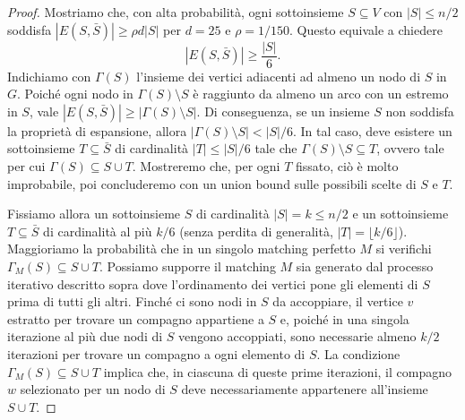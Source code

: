 \begin{proof}
	Mostriamo che, con alta probabilità, ogni sottoinsieme $S \subseteq V$ con
	$|S| \le n / 2$ soddisfa $|E(S, \bar S)| \ge \rho d |S|$ per $d = 25$ e
	$\rho = 1 / 150$. Questo equivale a chiedere
	\[
		|E(S, \bar S)| \ge \frac{|S|}{6}.
	\]
	Indichiamo con $\Gamma(S)$ l'insieme dei vertici adiacenti ad almeno un
	nodo di $S$ in $G$. Poiché ogni nodo in $\Gamma(S) \setminus S$ è
	raggiunto da almeno un arco con un estremo in $S$, vale
	$|E(S, \bar S)| \ge |\Gamma(S) \setminus S|$.
	Di conseguenza, se un insieme $S$ non soddisfa la proprietà di espansione,
	allora $|\Gamma(S) \setminus S| < |S| / 6$.
	In tal caso, deve esistere un sottoinsieme $T \subseteq \bar S$ di cardinalità
	$|T| \le |S|/6$ tale che $\Gamma(S) \setminus S \subseteq T$, ovvero tale per cui
	$\Gamma(S) \subseteq S \cup T$.
	Mostreremo che, per ogni $T$ fissato, ciò è molto improbabile, poi
	concluderemo con un union bound sulle possibili scelte di $S$ e $T$.
	
	Fissiamo allora un sottoinsieme $S$ di cardinalità $|S| = k \le n/2$ e un
	sottoinsieme $T \subseteq \bar S$ di cardinalità al più $k/6$ (senza perdita
	di generalità, $|T| = \lfloor k/6 \rfloor$).
	Maggioriamo la probabilità che in un singolo matching perfetto $M$ si verifichi
	$\Gamma_M(S) \subseteq S \cup T$.
	Possiamo supporre il matching $M$ sia generato dal processo iterativo
	descritto sopra dove l'ordinamento dei vertici pone gli elementi di $S$
	prima di tutti gli altri.
	Finché ci sono nodi in $S$ da accoppiare, il vertice $v$ estratto
	per trovare un compagno appartiene a $S$ e, poiché in una singola iterazione
	al più due nodi di $S$ vengono accoppiati, sono necessarie almeno $k/2$
	iterazioni per trovare un compagno a ogni elemento di $S$.
	La condizione $\Gamma_M(S) \subseteq S \cup T$ implica che, in ciascuna di
	queste prime iterazioni, il compagno $w$ selezionato per un nodo di $S$ deve
	necessariamente appartenere all'insieme $S \cup T$.
	

\end{proof}

